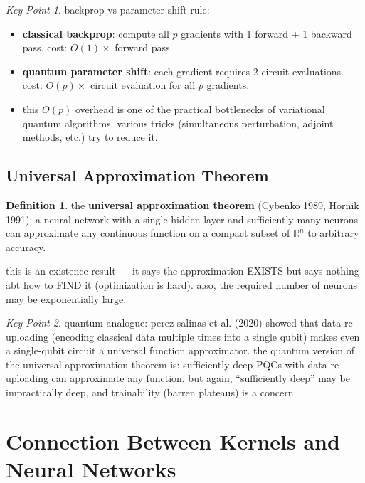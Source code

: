 \documentclass[11pt,a4paper]{article}
\theoremstyle{definition}
\newtheorem{definition}{Definition}[section]
\theoremstyle{remark}
\newtheorem*{keypoint}{Key Point}
\begin{document}
\begin{keypoint}
backprop vs parameter shift rule:
\begin{itemize}
    \item \textbf{classical backprop}: compute all $p$ gradients with 1 forward + 1 backward pass. cost: $O(1) \times$ forward pass.
    \item \textbf{quantum parameter shift}: each gradient requires 2 circuit evaluations. cost: $O(p) \times$ circuit evaluation for all $p$ gradients.
    \item this $O(p)$ overhead is one of the practical bottlenecks of variational quantum algorithms. various tricks (simultaneous perturbation, adjoint methods, etc.) try to reduce it.
\end{itemize}
\end{keypoint}

\subsection{Universal Approximation Theorem}

\begin{definition}
the \textbf{universal approximation theorem} (Cybenko 1989, Hornik 1991): a neural network with a single hidden layer and sufficiently many neurons can approximate any continuous function on a compact subset of $\mathbb{R}^n$ to arbitrary accuracy.
\end{definition}

this is an existence result --- it says the approximation EXISTS but says nothing abt how to FIND it (optimization is hard). also, the required number of neurons may be exponentially large.

\begin{keypoint}
quantum analogue: perez-salinas et al. (2020) showed that data re-uploading (encoding classical data multiple times into a single qubit) makes even a single-qubit circuit a universal function approximator. the quantum version of the universal approximation theorem is: sufficiently deep PQCs with data re-uploading can approximate any function. but again, ``sufficiently deep'' may be impractically deep, and trainability (barren plateaus) is a concern.
\end{keypoint}

\section{Connection Between Kernels and Neural Networks}
\end{document}
